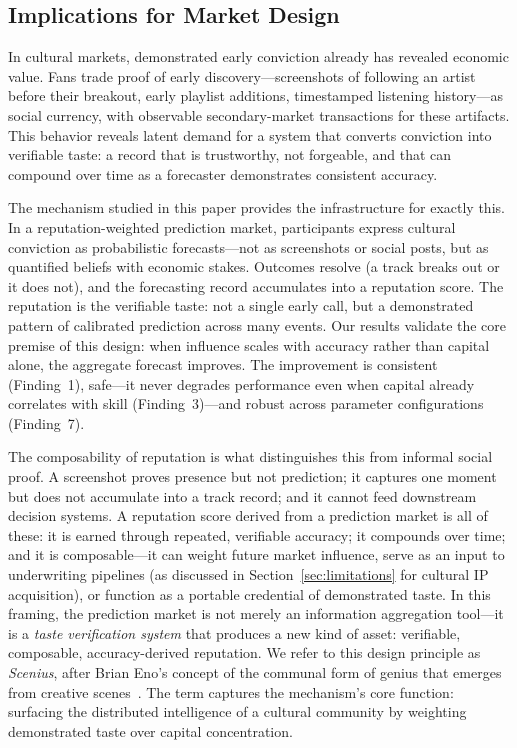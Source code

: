 \documentclass[conference]{IEEEtran}
\begin{document}
\subsection{Implications for Market Design}
\label{sec:discussion-design}

In cultural markets, demonstrated early conviction already has revealed economic value. Fans trade proof of early discovery---screenshots of following an artist before their breakout, early playlist additions, timestamped listening history---as social currency, with observable secondary-market transactions for these artifacts. This behavior reveals latent demand for a system that converts conviction into verifiable taste: a record that is trustworthy, not forgeable, and that can compound over time as a forecaster demonstrates consistent accuracy.

The mechanism studied in this paper provides the infrastructure for exactly this. In a reputation-weighted prediction market, participants express cultural conviction as probabilistic forecasts---not as screenshots or social posts, but as quantified beliefs with economic stakes. Outcomes resolve (a track breaks out or it does not), and the forecasting record accumulates into a reputation score. The reputation is the verifiable taste: not a single early call, but a demonstrated pattern of calibrated prediction across many events. Our results validate the core premise of this design: when influence scales with accuracy rather than capital alone, the aggregate forecast improves. The improvement is consistent (Finding~1), safe---it never degrades performance even when capital already correlates with skill (Finding~3)---and robust across parameter configurations (Finding~7).

The composability of reputation is what distinguishes this from informal social proof. A screenshot proves presence but not prediction; it captures one moment but does not accumulate into a track record; and it cannot feed downstream decision systems. A reputation score derived from a prediction market is all of these: it is earned through repeated, verifiable accuracy; it compounds over time; and it is composable---it can weight future market influence, serve as an input to underwriting pipelines (as discussed in Section~\ref{sec:limitations} for cultural IP acquisition), or function as a portable credential of demonstrated taste. In this framing, the prediction market is not merely an information aggregation tool---it is a \emph{taste verification system} that produces a new kind of asset: verifiable, composable, accuracy-derived reputation. We refer to this design principle as \emph{Scenius}, after Brian Eno's concept of the communal form of genius that emerges from creative scenes~\cite{eno2009}. The term captures the mechanism's core function: surfacing the distributed intelligence of a cultural community by weighting demonstrated taste over capital concentration.
\end{document}
